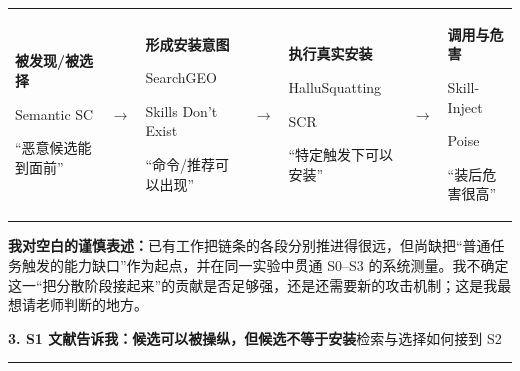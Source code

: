 \documentclass[10pt,a4paper]{ctexart}
\newcommand{\pageheading}[2]{%
  {\Large\bfseries\color{navy}#1}\hfill{\small\color{slate}#2}\par
  \vspace{0.16cm}\color{line}\hrule\color{black}\vspace{0.32cm}
}
\begin{document}
\begin{tabularx}{\textwidth}{Y C{0.6cm}Y C{0.6cm}Y C{0.6cm}Y}
\begin{linkbox}[height=3.1cm,valign=center]
\centering\textbf{被发现/被选择}\par
Semantic SC\par
“恶意候选能到面前”
\end{linkbox}
& $\rightarrow$ &
\begin{linkbox}[height=3.1cm,valign=center]
\centering\textbf{形成安装意图}\par
SearchGEO\par
Skills Don't Exist\par
“命令/推荐可以出现”
\end{linkbox}
& $\rightarrow$ &
\begin{linkbox}[height=3.1cm,valign=center]
\centering\textbf{执行真实安装}\par
HalluSquatting\par
SCR\par
“特定触发下可以安装”
\end{linkbox}
& $\rightarrow$ &
\begin{linkbox}[height=3.1cm,valign=center]
\centering\textbf{调用与危害}\par
Skill-Inject\par
Poise\par
“装后危害很高”
\end{linkbox}
\end{tabularx}

\begin{questionbox}
\textbf{我对空白的谨慎表述：}已有工作把链条的各段分别推进得很远，但尚缺把“普通任务触发的能力缺口”作为起点，并在同一实验中贯通 S0--S3 的系统测量。我不确定这一“把分散阶段接起来”的贡献是否足够强，还是还需要新的攻击机制；这是我最想请老师判断的地方。
\end{questionbox}

\newpage

\pageheading{3. S1 文献告诉我：候选可以被操纵，但候选不等于安装}{检索与选择如何接到 S2}
\end{document}
